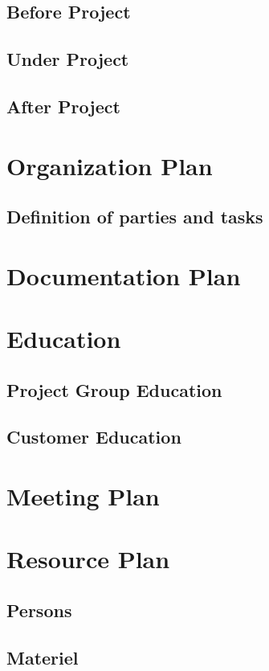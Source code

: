 \documentclass[a4paper,12pt]{article}
\begin{document}
\subsection{Before Project}
\subsection{Under Project}
\subsection{After Project}

\section{Organization Plan}
\subsection{Definition of parties and tasks}

\section{Documentation Plan}	

\section{Education}	
\subsection{Project Group Education}
\subsection{Customer Education}

\section{Meeting Plan}

\section{Resource Plan}
\subsection{Persons}
\subsection{Materiel}
\end{document}
